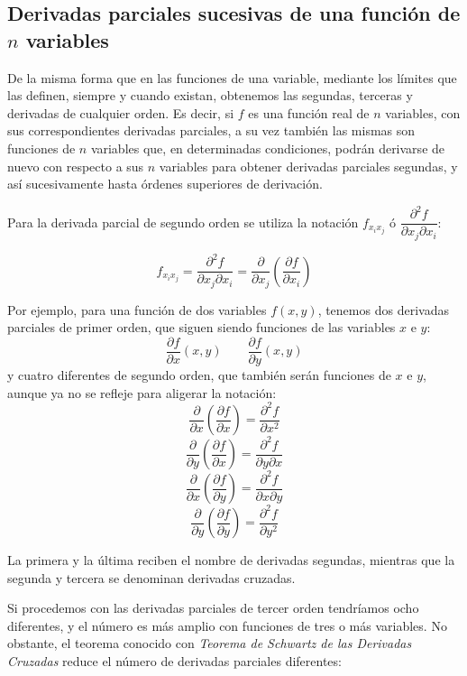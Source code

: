 \subsection{Derivadas parciales sucesivas de una función de $n$
variables}

De la misma forma que en las funciones de una variable, mediante los
límites que las definen, siempre y cuando existan, obtenemos las
segundas, terceras y derivadas de cualquier orden. Es decir, si $f$
es una función real de $n$ variables, con sus correspondientes
derivadas parciales, a su vez también las mismas son funciones de
$n$ variables que, en determinadas condiciones, podrán derivarse de
nuevo con respecto a sus $n$ variables para obtener derivadas
parciales segundas, y así sucesivamente hasta órdenes superiores de
derivación.

Para la derivada parcial de segundo orden se utiliza la notación
$f_{x_ix_j}$ ó $\dfrac{{\partial ^2 f}} {{\partial x_j \partial x_i
}}$:


\[
f_{x_i x_j }  = \frac{{\partial ^2 f}} {{\partial x_j \partial x_i
}} = \frac{\partial } {{\partial x_j }}\left( {\frac{{\partial f}}
{{\partial x_i }}} \right)
\]

Por ejemplo, para una función de dos variables $f(x,y)$, tenemos dos derivadas parciales de primer orden, que siguen
siendo funciones de las variables $x$ e $y$:
\[
\frac{\partial f}{\partial x}(x,y)\qquad \frac{\partial f}{\partial y}(x,y) 
\] y cuatro diferentes de segundo orden, que también serán funciones de $x$ e $y$, aunque ya no se
refleje para aligerar la notación:
\[
\frac{\partial}{\partial x}\left({\frac{\partial f}{\partial x}}\right) = \frac{\partial^2 f}{\partial x^2}
\]
\[
\frac{\partial}{\partial y}\left({\frac{\partial f}{\partial x}}\right) = \frac{\partial^2 f}{\partial y\partial x}
\]
\[
\frac{\partial}{\partial x}\left({\frac{\partial f}{\partial y}}\right) = \frac{\partial^2 f}{\partial x\partial y}
\]
\[
\frac{\partial}{\partial y}\left({\frac{\partial f}{\partial y}}\right) = \frac{\partial^2 f}{\partial y^2}
\]

La primera y la última reciben el nombre de derivadas segundas, mientras que la segunda y tercera se denominan derivadas
cruzadas.

Si procedemos con las derivadas parciales de tercer orden tendríamos ocho diferentes, y el número es más amplio con
funciones de tres o más variables.
No obstante, el teorema conocido con \emph{Teorema de Schwartz de las Derivadas Cruzadas} reduce el número de derivadas
parciales diferentes:

